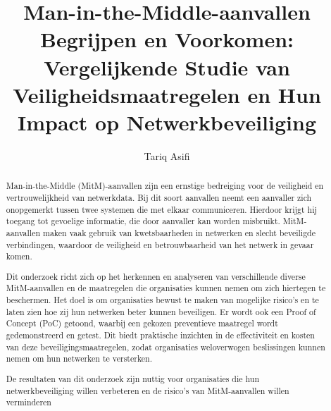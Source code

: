 \documentclass{hogent-article}
\title{Man-in-the-Middle-aanvallen Begrijpen en Voorkomen: Vergelijkende Studie van Veiligheidsmaatregelen en Hun Impact op Netwerkbeveiliging}
\author{Tariq Asifi}
\begin{document}
\begin{abstract}
  Man-in-the-Middle (MitM)-aanvallen zijn een ernstige bedreiging voor de veiligheid en vertrouwelijkheid van netwerkdata. Bij dit soort aanvallen neemt een aanvaller zich onopgemerkt tussen twee systemen die met elkaar communiceren. Hierdoor krijgt hij toegang tot gevoelige informatie, die door aanvaller kan worden misbruikt. MitM-aanvallen maken vaak gebruik van kwetsbaarheden in netwerken en slecht beveiligde verbindingen, waardoor de veiligheid en betrouwbaarheid van het netwerk in gevaar komen.

  Dit onderzoek richt zich op het herkennen en analyseren van verschillende diverse MitM-aanvallen en de maatregelen die organisaties kunnen nemen om zich hiertegen te beschermen. Het doel is om organisaties bewust te maken van mogelijke risico's en te laten zien hoe zij hun netwerken beter kunnen beveiligen. Er wordt ook een Proof of Concept (PoC) getoond, waarbij een gekozen preventieve maatregel wordt gedemonstreerd en getest. Dit biedt praktische inzichten in de effectiviteit en kosten van deze beveiligingsmaatregelen, zodat organisaties weloverwogen beslissingen kunnen nemen om hun netwerken te versterken.
  
  De resultaten van dit onderzoek zijn nuttig voor organisaties die hun netwerkbeveiliging willen verbeteren en de risico’s van MitM-aanvallen willen verminderen
\end{abstract}

\tableofcontents



\printbibliography[heading=bibintoc]
\end{document}
